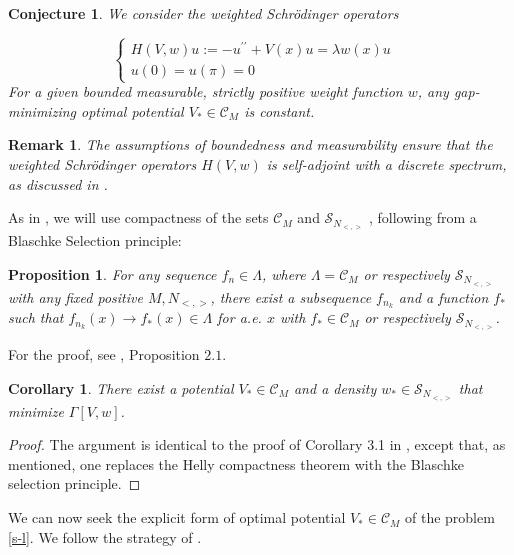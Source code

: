 \documentclass[12pt,a4paper]{amsart}
\newtheorem{rem}{Remark}[section]
\newtheorem{prop}{Proposition}[section]
\newtheorem{conj}[theorem]{Conjecture}
\newtheorem{cor}{Corollary}[section]
\begin{document}
\begin{conj}
We consider the weighted Schr\"{o}dinger operators

\begin{equation}\label{eq12}
\left\{
\begin{array}{lr}
H(V,w) u :=  -u^{\prime \prime} +V(x) u  = \lambda  w(x) u
 \\
u(0)=u(\pi)=0 & 
\end{array}
\right.
\end{equation}
For a given bounded measurable, strictly positive weight function $w$, any 
gap-minimizing
optimal potential $V_{*}\in \mathcal{C}_M $ is constant.
\end{conj}


\begin{rem}\label{rem1}
The assumptions of boundedness and measurability ensure that the weighted Schr\"{o}dinger operators $H(V,w)$  is self-adjoint with a discrete spectrum, as discussed in \cite{Wei}.
\end{rem}

{As in \cite{ElAHar}, we will use compactness of the sets $\mathcal{C}_M$ and $\mathcal{S}_{N_{<,>}}$ , following from a Blaschke Selection principle: }

\begin{prop}\label{compact}
For any sequence $f_{n}\in\Lambda$, where $\Lambda=\mathcal{C}_M$ or
respectively $\mathcal{S}_{N_{<,>}}$ with any fixed positive $M, N_{<,>}$, there exist a subsequence $f_{n_{k}}$ and a function $f_{*}$ such that  $f_{n_{k}}(x)\longrightarrow f_{*}(x) \in\Lambda $ for a.e. $x$ with $f_{*} \in \mathcal{C}_M$ or respectively $\mathcal{S}_{N_{<,>}}$.
\end{prop}

\noindent
{For the proof,  see \cite{ElAHar},
Proposition $2.1$.}

\begin{cor}\label{existence}
There exist a potential $V_{*}\in \mathcal{C}_M $ and a density $w_{*}\in \mathcal{S}_{N_{<,>}}$ that minimize $\Gamma[V,w]$.
\end{cor}

\begin{proof}  
The argument is identical to the proof of Corollary 3.1 in \cite{AHRA}, except that, as mentioned, one replaces the Helly compactness theorem with the Blaschke selection principle.
\end{proof}  

We can now seek the explicit form of optimal potential  $V_{*}\in \mathcal{C}_M $ of the problem  
{\eqref{s-l}}. We follow the strategy of \cite{AHRA}.
\end{document}
